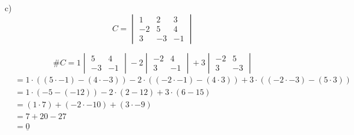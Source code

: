 \documentclass{article}
\begin{document}
c)
\[C = \begin{vmatrix}
    1 & 2 & 3 \\ -2 & 5 & 4 \\ 3 & -3 & -1
\end{vmatrix}\]

\[\#C = 
1\begin{vmatrix}
    5 & 4 \\ -3 & -1
\end{vmatrix} -
2\begin{vmatrix}
    -2 & 4 \\ 3 & -1
\end{vmatrix} +
3\begin{vmatrix}
    -2 & 5 \\ 3 & -3
\end{vmatrix}\]
\begin{align*}
    &= 1 \cdot ( (5\cdot-1) - (4\cdot-3) ) -2 \cdot ( (-2\cdot-1) - (4\cdot3) ) +3 \cdot ( (-2\cdot-3) - (5\cdot3) ) \\
   &=  1 \cdot (-5 - (-12)) -2 \cdot (2 - 12) +3  \cdot (6 - 15) \\
   &= (1 \cdot 7) + (-2 \cdot -10) + (3 \cdot -9) \\
   &= 7 + 20 - 27 \\
   &= \underline{0}
\end{align*}
\end{document}
